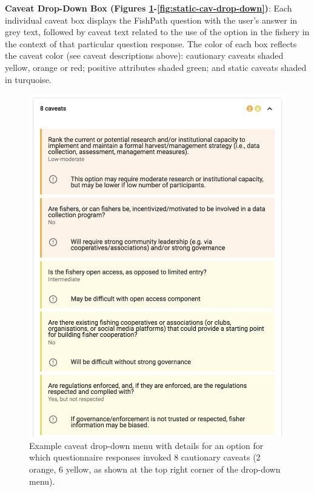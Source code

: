 \documentclass[
  11pt,
]{book}
\begin{document}
\textbf{Caveat Drop-Down Box (Figures \ref{fig:cav-drop-down}-\ref{fig:static-cav-drop-down})}: Each individual caveat box displays the FishPath question with the user's answer in grey text, followed by caveat text related to the use of the option in the fishery in the context of that particular question response. The color of each box reflects the caveat color (see caveat descriptions above): cautionary caveats shaded yellow, orange or red; positive attributes shaded green; and static caveats shaded in turquoise.

\begin{figure}

{\centering \includegraphics[width=0.75\linewidth]{images/cav-drop-down} 

}

\caption{Example caveat drop-down menu with details for an option for which questionnaire responses invoked 8 cautionary caveats (2 orange, 6 yellow, as shown at the top right corner of the drop-down menu).}\label{fig:cav-drop-down}
\end{figure}
\end{document}
